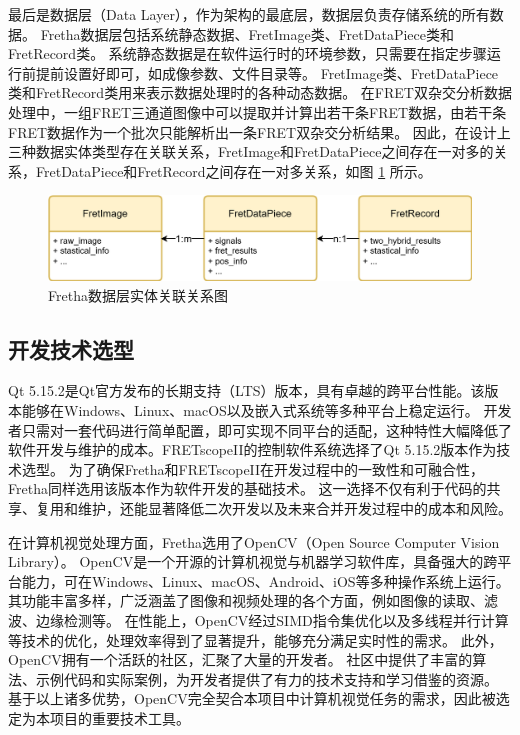 最后是数据层（Data Layer），作为架构的最底层，数据层负责存储系统的所有数据。
Fretha数据层包括系统静态数据、FretImage类、FretDataPiece类和FretRecord类。
系统静态数据是在软件运行时的环境参数，只需要在指定步骤运行前提前设置好即可，如成像参数、文件目录等。
FretImage类、FretDataPiece类和FretRecord类用来表示数据处理时的各种动态数据。
在FRET双杂交分析数据处理中，一组FRET三通道图像中可以提取并计算出若干条FRET数据，由若干条FRET数据作为一个批次只能解析出一条FRET双杂交分析结果。
因此，在设计上三种数据实体类型存在关联关系，FretImage和FretDataPiece之间存在一对多的关系，FretDataPiece和FretRecord之间存在一对多关系，如图 \ref{fig:fretha_data_relations} 所示。

\begin{figure}[hbtp]
    \centering
    \includegraphics[width=1\linewidth]{../figures/2/2_Fretha数据层对应关系.png}
    \caption{Fretha数据层实体关联关系图}
    \label{fig:fretha_data_relations}
\end{figure}

\subsection{开发技术选型}
\ifshowtext
Qt 5.15.2是Qt官方发布的长期支持（LTS）版本，具有卓越的跨平台性能。该版本能够在Windows、Linux、macOS以及嵌入式系统等多种平台上稳定运行。
开发者只需对一套代码进行简单配置，即可实现不同平台的适配，这种特性大幅降低了软件开发与维护的成本。FRETscopeII的控制软件系统选择了Qt 5.15.2版本作为技术选型。
为了确保Fretha和FRETscopeII在开发过程中的一致性和可融合性，Fretha同样选用该版本作为软件开发的基础技术。
这一选择不仅有利于代码的共享、复用和维护，还能显著降低二次开发以及未来合并开发过程中的成本和风险。

在计算机视觉处理方面，Fretha选用了OpenCV（Open Source Computer Vision Library）。
OpenCV是一个开源的计算机视觉与机器学习软件库，具备强大的跨平台能力，可在Windows、Linux、macOS、Android、iOS等多种操作系统上运行。
其功能丰富多样，广泛涵盖了图像和视频处理的各个方面，例如图像的读取、滤波、边缘检测等。
在性能上，OpenCV经过SIMD指令集优化以及多线程并行计算等技术的优化，处理效率得到了显著提升，能够充分满足实时性的需求。
此外，OpenCV拥有一个活跃的社区，汇聚了大量的开发者。
社区中提供了丰富的算法、示例代码和实际案例，为开发者提供了有力的技术支持和学习借鉴的资源。
基于以上诸多优势，OpenCV完全契合本项目中计算机视觉任务的需求，因此被选定为本项目的重要技术工具。

